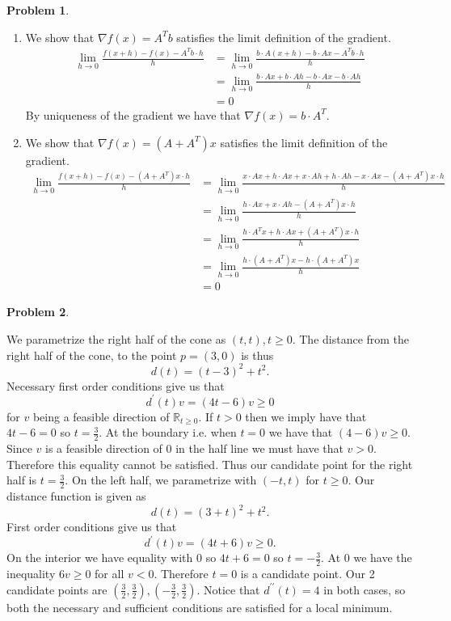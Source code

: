 \documentclass[12pt, a4paper]{article}
\newtheorem{problem}{Problem}
\theoremstyle{definition}
\newcommand{\penum}{ \begin{enumerate}[label=\bf(\alph*), leftmargin=0pt]}
\newcommand{\epenum}{ \end{enumerate} }
\newcommand{\R}{\mathbb{R}}                           %
\newcommand{\grad}{\nabla}
\begin{document}
\newpage
\begin{problem}
\end{problem}
\penum
\item We show that $\grad f(x) = A^T b$ satisfies the limit definition of the gradient. 
\begin{align*}
	\lim_{h \to 0} \frac{f(x+h) - f(x)- A^Tb \cdot h}{h} & = \lim_{h \to 0} \frac{b \cdot A(x+h) - b \cdot Ax - A^Tb \cdot h}{h}
	\\ & = \lim_{h \to 0} \frac{b \cdot Ax + b \cdot Ah - b \cdot Ax - b \cdot Ah}{h} \tag{since $A^Tb = b \cdot A$}
	\\ & = 0
\end{align*}
By uniqueness of the gradient we have that $\grad f(x) = b \cdot A^T$. 
\item We show that $\grad f (x) = (A+A^T)x$ satisfies the limit definition of the gradient. 
\begin{align*}
	\lim_{h \to 0} \frac{f(x+h) - f(x)- (A+ A^T)x\cdot h}{h}
	  &= \lim_{h \to 0}\frac{x \cdot A x + h \cdot Ax + x \cdot Ah + h \cdot A h - x \cdot Ax -(A+ A^T)x\cdot h }{h}
	  \\ & = \lim_{h \to 0} \frac{h \cdot A x + x \cdot Ah - (A+A^T)x \cdot h}{h}
	  \\ & = \lim_{h \to 0 } \frac{h \cdot A^T x + h \cdot Ax +  (A+A^T)x\cdot h}{h}
	  \\ & = \lim_{h\to 0} \frac{h \cdot(A+A^T)x - h \cdot (A+A^T)x}{h}
	  \\ & = 0
\end{align*}
\epenum 
\newpage
\begin{problem}
\end{problem}
We parametrize the right half of the cone as $(t,t), t\geq 0$. The distance from the right half of the cone, to the point $p = (3,0)$ is thus
$$d(t) = (t-3)^2 + t^2.$$
Necessary first order conditions give us that $$d^\prime(t) v = (4t - 6)v \geq 0$$ for $v$ being a feasible direction of $\R_{t\geq 0}$. 
If $t>0$ then we imply have that $4t-6 = 0$ so $t =\frac{3}{2}$. At the boundary i.e. when $t=0$ we have that $(4-6)v \geq 0$. Since $v$ is a feasible direction of $0$ in the half line we must have that $v>0$. 
Therefore this equality cannot be satisfied. Thus our candidate point for the right half is $t = \frac{3}{2}$. On the left half, we parametrize with $(-t,t)$ for $t\geq 0$.  Our distance function is given as 
$$d(t) = (3+t)^2 + t^2.$$
First order conditions give us that 
$$d^\prime(t)v = (4t+6)v \geq 0.$$
On the interior we have equality with $0$ so $4t+6 = 0 $ so $t = -\frac{3}{2}$. At 0 we have the inequality $6v \geq 0$ for all $v<0$. Therefore $t=0$ is a candidate point. Our 2 candidate points are $(\frac{3}{2}, \frac{3}{2}) , (-\frac{3}{2} , \frac{3}{2})$. Notice that $d^{\prime \prime}(t) =4$ in both cases, so both the necessary and sufficient conditions are satisfied for a local minimum.
\end{document}

